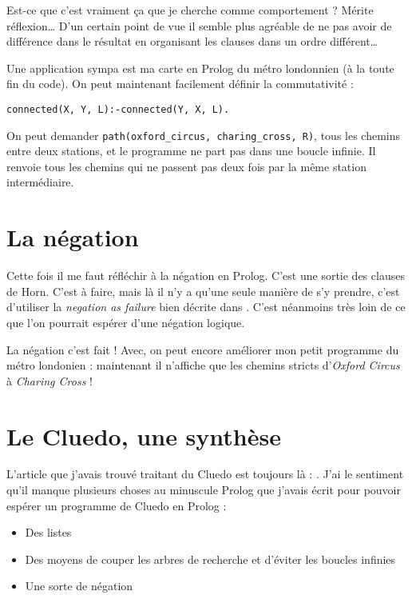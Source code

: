 \documentclass{article}
\begin{document}
Est-ce que c'est vraiment ça que je cherche comme comportement ? Mérite réflexion\ldots{} D'un certain point de vue il semble plus agréable de ne pas avoir de différence dans le résultat en organisant les clauses dans un ordre différent\ldots{}

Une application sympa est ma carte en Prolog du métro londonnien (à la toute fin du code). On peut maintenant facilement définir la commutativité :

\texttt{connected(X, Y, L):-connected(Y, X, L).}

On peut demander \texttt{path(oxford\_circus, charing\_cross, R)}, tous les chemins entre deux stations, et le programme ne part pas dans une boucle infinie. Il renvoie tous les chemins qui ne passent pas deux fois par la même station intermédiaire.

\section{La négation}

Cette fois il me faut réfléchir à la négation en Prolog. C'est une sortie des clauses de Horn. C'est à faire, mais là il n'y a qu'une seule manière de s'y prendre, c'est d'utiliser la \emph{negation as failure} bien décrite dans \cite{Clark}. C'est néanmoins très loin de ce que l'on pourrait espérer d'une négation logique.

La négation c'est fait ! Avec, on peut encore améliorer mon petit programme du métro londonien : maintenant il n'affiche que les chemins stricts d'\emph{Oxford Circus} à \emph{Charing Cross} !



\section{Le Cluedo, une synthèse}

L'article que j'avais trouvé traitant du Cluedo est toujours là : \cite{Aartun}. J'ai le sentiment qu'il manque plusieurs choses au minuscule Prolog que j'avais écrit pour pouvoir espérer un programme de Cluedo en Prolog :

\begin{itemize}
  \item
    Des listes
  \item
    Des moyens de couper les arbres de recherche et d'éviter les boucles infinies
  \item
    Une sorte de négation
\end{itemize}
\end{document}
